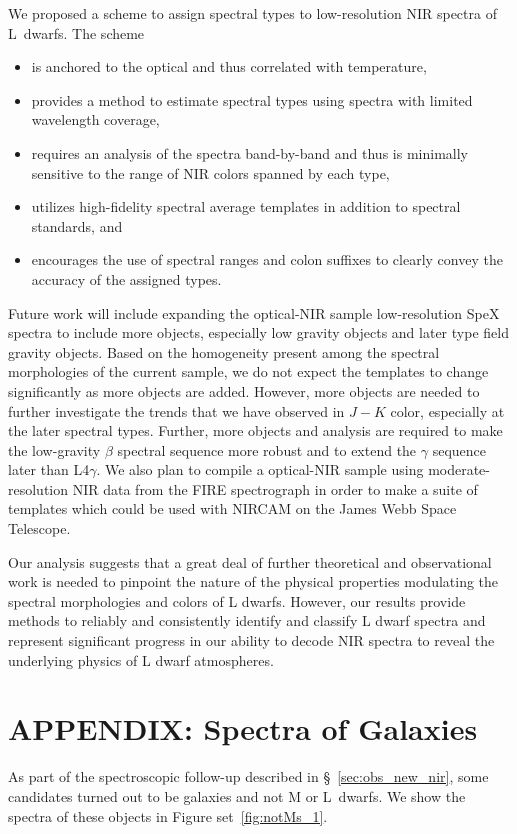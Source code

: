 \documentclass[12pt,preprint]{aastex}
\begin{document}
We proposed a scheme to assign spectral types to low-resolution NIR spectra of L~dwarfs. 
The scheme
\begin{itemize}
\item is anchored to the optical and thus correlated with temperature,
\item provides a method to estimate spectral types using spectra with limited wavelength coverage, 
\item requires an analysis of the spectra band-by-band and thus is minimally sensitive to the range of NIR colors spanned by each type, 
\item utilizes high-fidelity spectral average templates in addition to spectral standards, and
\item encourages the use of spectral ranges and colon suffixes to clearly convey the accuracy of the assigned types.
\end{itemize}

Future work will include expanding the optical-NIR sample low-resolution SpeX spectra to include more objects, especially low gravity objects and later type field gravity objects.
Based on the homogeneity present among the spectral morphologies of the current sample, we do not expect the templates to change significantly as more objects are added.
However, more objects are needed to further investigate the trends that we have observed in $J-K$ color, especially at the later spectral types.
Further, more objects and analysis are required to make the low-gravity $\beta$ spectral sequence more robust and to extend the $\gamma$ sequence later than L4$\gamma$.
We also plan to compile a optical-NIR sample using moderate-resolution NIR data from the FIRE spectrograph in order to make a suite of templates which could be used with NIRCAM on the James Webb Space Telescope.

Our analysis suggests that a great deal of further theoretical and observational work is needed to pinpoint the nature of the physical properties modulating the spectral morphologies and colors of L dwarfs.
However, our results provide methods to reliably and consistently identify and classify L dwarf spectra and represent significant progress in our ability to decode NIR spectra to reveal the underlying physics of L dwarf atmospheres.

\appendix
\section{APPENDIX: Spectra of Galaxies}
\label{sec:galaxies}
As part of the spectroscopic follow-up described in \S~\ref{sec:obs_new_nir}, some candidates turned out to be galaxies and not M or L~dwarfs. We show the spectra of these objects in Figure set~\ref{fig:notMs_1}.
\end{document}
